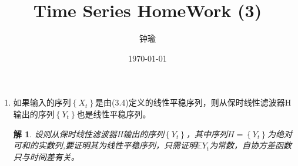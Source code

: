 \documentclass[11pt,a4paper]{ctexart}
\title{Time Series HomeWork (3)}
\author{钟瑜 \quad 222018314210044}
\date{\today}
\newtheorem*{solution}{解}
\begin{document}
\maketitle
\pagestyle{plain}%
\begin{enumerate}
	
\item[1.]如果输入的序列$\left\lbrace X_t\right\rbrace $是由(3.4)定义的线性平稳序列，则从保时线性滤波器H输出的序列$\left\lbrace Y_t\right\rbrace$也是线性平稳序列。

\begin{solution}
设则从保时线性滤波器H输出的序列$\left\lbrace Y_t\right\rbrace$，其中序列$H=\left\lbrace Y_t\right\rbrace $为绝对可和的实数列,要证明其为线性平稳序列，只需证明$\mathbb{E}Y_t$为常数，自协方差函数只与时间差有关。


\end{solution}
\end{enumerate}
\end{document}
